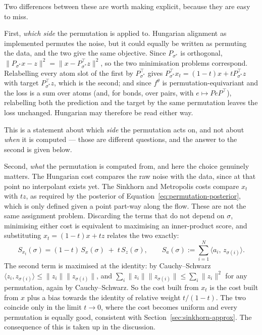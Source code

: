 Two differences between these are worth making explicit, because they are easy to miss.

First, \emph{which side} the permutation is applied to. Hungarian alignment as implemented permutes
the noise, but it could equally be written as permuting the data, and the two give the same
objective. Since $P_{\sigma^*}$ is orthogonal,
$\|P_{\sigma^*} x - z\|^2 = \|x - P_{\sigma^*}^\top z\|^2$, so the two minimisation problems
correspond. Relabelling every atom slot of the first by $P_{\sigma^*}^\top$ gives
$P_{\sigma^*}^\top x_t = (1-t)x + t P_{\sigma^*}^\top z$ with target $P_{\sigma^*}^\top z$, which is
the second; and since $f^\theta$ is permutation-equivariant and the loss is a sum over atoms (and,
for bonds, over pairs, with $e \mapsto P e P^\top$), relabelling both the prediction and the target
by the same permutation leaves the loss unchanged. Hungarian may therefore be read either way.

This is a statement about which \emph{side} the permutation acts on, and not about \emph{when} it is
computed --- those are different questions, and the answer to the second is given below.

Second, \emph{what} the permutation is computed from, and here the choice genuinely matters. The
Hungarian cost compares the raw noise with the data, since at that point no interpolant exists yet.
The Sinkhorn and Metropolis costs compare $x_t$ with $tz$, as required by the posterior of
Equation~\eqref{eq:permutation-posterior}, which is only defined given a point part-way along the
flow. These are not the same assignment problem. Discarding the terms that do not depend on
$\sigma$, minimising either cost is equivalent to maximising an inner-product score, and
substituting $x_t = (1-t)x + tz$ relates the two exactly:
\begin{equation}
    S_{x_t}(\sigma) = (1-t)\, S_{x}(\sigma) \;+\; t\, S_{z}(\sigma),
    \qquad
    S_{a}(\sigma) := \sum_{i=1}^{N} \langle a_i,\, z_{\sigma(i)} \rangle .
    \label{eq:cost-decomposition}
\end{equation}
The second term is maximised at the identity: by Cauchy--Schwarz
$\langle z_i, z_{\sigma(i)}\rangle \le \|z_i\|\|z_{\sigma(i)}\|$, and
$\sum_i \|z_i\|\|z_{\sigma(i)}\| \le \sum_i \|z_i\|^2$ for any permutation, again by
Cauchy--Schwarz. So the cost built from $x_t$ is the cost built from $x$ plus a bias towards the
identity of relative weight $t/(1-t)$. The two coincide only in the limit $t \to 0$, where the cost
becomes uniform and every permutation is equally good, consistent with
Section~\ref{sec:sinkhorn-approx}. The consequence of this is taken up in the discussion.

